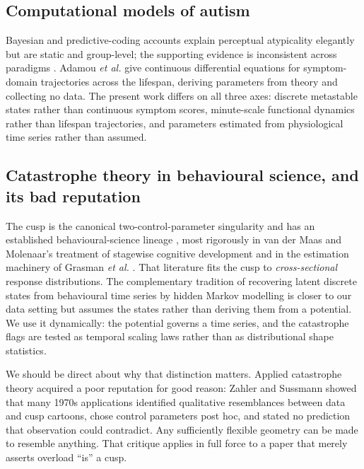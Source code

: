 \documentclass[conference]{IEEEtran}
\begin{document}
\subsection{Computational models of autism}
Bayesian and predictive-coding accounts \cite{pellicano2012,arthur2023}
explain perceptual atypicality elegantly but are static and group-level; the
supporting evidence is inconsistent across paradigms \cite{chrysaitis2023}.
Adamou \emph{et al.} \cite{adamou2026} give continuous differential equations
for symptom-domain trajectories across the lifespan, deriving parameters from
theory and collecting no data. The present work differs on all three axes:
discrete metastable states rather than continuous symptom scores, minute-scale
functional dynamics rather than lifespan trajectories, and parameters estimated
from physiological time series rather than assumed.

\subsection{Catastrophe theory in behavioural science, and its bad reputation}
The cusp is the canonical two-control-parameter singularity \cite{thom1975,
gilmore1981} and has an established behavioural-science lineage
\cite{zeeman1976}, most rigorously in van der Maas and Molenaar's treatment of
stagewise cognitive development \cite{vandermaas1992} and in the estimation
machinery of Grasman \emph{et al.} \cite{grasman2009}. That literature fits the
cusp to \emph{cross-sectional} response distributions. The complementary
tradition of recovering latent discrete states from behavioural time series by
hidden Markov modelling \cite{li2023,eisenberg2019} is closer to our
data setting but assumes the states rather than deriving them from a
potential. We use it dynamically:
the potential governs a time series, and the catastrophe flags are tested as
temporal scaling laws rather than as distributional shape statistics.

We should be direct about why that distinction matters. Applied catastrophe
theory acquired a poor reputation for good reason: Zahler and Sussmann
\cite{zahler1977,sussmann1978} showed that many 1970s applications identified
qualitative resemblances between data and cusp cartoons, chose control
parameters post hoc, and stated no prediction that observation could
contradict. Any sufficiently flexible geometry can be made to resemble
anything. That critique applies in full force to a paper that merely asserts
overload ``is'' a cusp.
\end{document}
